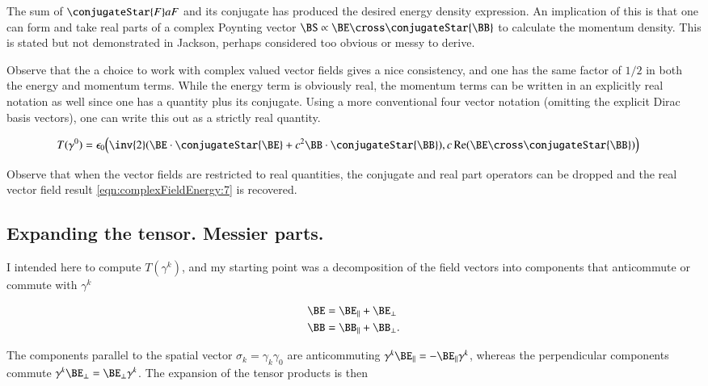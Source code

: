 The sum of $\conjugateStar{F} a F$ and its conjugate has produced the desired energy density expression.  An implication of this is that one can form and take real parts of a complex Poynting vector $\BS \propto \BE \cross \conjugateStar{\BB}$ to calculate the momentum density.  This is stated but not demonstrated in Jackson, perhaps considered too obvious or messy to derive.

Observe that the a choice to work with complex valued vector fields gives a nice consistency, and one has the same factor of $1/2$ in both the energy and momentum terms.  While the energy term is obviously real, the momentum terms can be written in an explicitly real notation as well since one has a quantity plus its conjugate.  Using a more conventional four vector notation (omitting the explicit Dirac basis vectors), one can write this out as a strictly real quantity.

\begin{align}\label{eqn:complexFieldEnergy:21}
T(\gamma^0) 
&=
\epsilon_0
\Bigl( \inv{2}(\BE \cdot \conjugateStar{\BE} + c^2 \BB \cdot \conjugateStar{\BB}),
c \Real( \BE \cross \conjugateStar{\BB} ) \Bigr)
\end{align}

Observe that when the vector fields are restricted to real quantities, the conjugate and real part operators can be dropped and the real vector field result \ref{eqn:complexFieldEnergy:7} is recovered.

\subsection{Expanding the tensor.  Messier parts.}

I intended here to compute $T(\gamma^k)$, and my starting point was a decomposition of the field vectors into components that anticommute or commute with $\gamma^k$

\begin{subequations}
\begin{align}\label{eqn:complexFieldEnergy:22}
\BE &= \BE_\parallel + \BE_\perp \\
\BB &= \BB_\parallel + \BB_\perp.
\end{align}
\end{subequations}

The components parallel to the spatial vector $\sigma_k = \gamma_k \gamma_0$ are anticommuting $\gamma^k \BE_\parallel = -\BE_\parallel \gamma^k$, whereas the perpendicular components commute $\gamma^k \BE_\perp = \BE_\perp \gamma^k$.  The expansion of the tensor products is then

